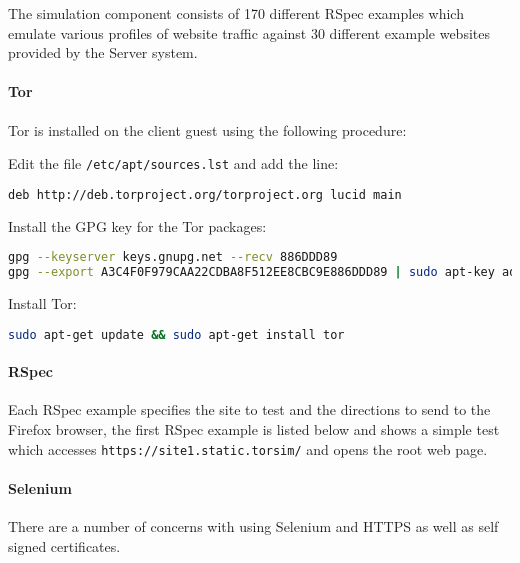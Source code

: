 The simulation component consists of 170 different RSpec examples which emulate
various profiles of website traffic against 30 different example websites
provided by the Server system.

\paragraph{Tor}
\label{install-tor}

Tor is installed on the client guest using the following procedure:

\begin{enumerate*}
  \item Edit the file \verb+/etc/apt/sources.lst+ and add the line:
    \begin{lstlisting}[language=sh]
deb http://deb.torproject.org/torproject.org lucid main
    \end{lstlisting}
  \item Install the GPG key for the Tor packages:
    \begin{lstlisting}[language=sh]
gpg --keyserver keys.gnupg.net --recv 886DDD89
gpg --export A3C4F0F979CAA22CDBA8F512EE8CBC9E886DDD89 | sudo apt-key add -
    \end{lstlisting}
  \item Install Tor:
    \begin{lstlisting}[language=sh]
sudo apt-get update && sudo apt-get install tor
    \end{lstlisting}
\end{enumerate*}

\paragraph{RSpec}

Each RSpec example specifies the site to test and the directions to send to the
Firefox browser, the first RSpec example is listed below and shows a simple test
which accesses \verb+https://site1.static.torsim/+ and opens the root web page.



\paragraph{Selenium}

There are a number of concerns with using Selenium and HTTPS as well as self
signed certificates.

